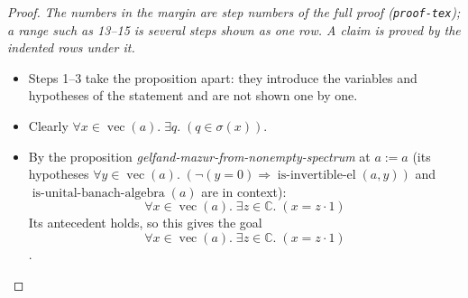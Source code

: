 \documentclass[11pt]{article}
\theoremstyle{plain}
\begin{document}
\begin{proof}
{\small\emph{The numbers in the margin are step numbers of the full proof (\texttt{proof-tex}); a range such as 13--15 is several steps shown as one row.  A claim is proved by the indented rows under it.}}\par\smallskip
\begin{itemize}[leftmargin=2.8em, itemsep=4pt, parsep=1pt]
  \item[\textbf{1--3}] Steps 1--3 take the proposition apart: they introduce the variables and hypotheses of the statement and are not shown one by one.
  \item[\textbf{4}] Clearly $\forall x \in \operatorname{vec}(a).\; \exists q.\; (q \in \sigma({x}))$.
  \item[\textbf{5--6}] By the proposition \emph{gelfand-mazur-from-nonempty-spectrum} at $a := a$ (its hypotheses $\forall y \in \operatorname{vec}(a).\; (\neg (y = 0) \Rightarrow \operatorname{is\text{-}invertible\text{-}el}(a, y))$ and $\operatorname{is\text{-}unital\text{-}banach\text{-}algebra}(a)$ are in context):
\begin{equation*}
\forall x \in \operatorname{vec}(a).\; \exists z \in \mathbb{C}.\; (x = z \cdot 1)
\end{equation*}
  Its antecedent holds, so this gives the goal
\begin{equation*}
\forall x \in \operatorname{vec}(a).\; \exists z \in \mathbb{C}.\; (x = z \cdot 1)
\end{equation*}
.
\end{itemize}
\end{proof}
\end{document}
